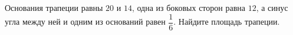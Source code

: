 \begin{ex}
	\begin{condition}
		Основания трапеции равны \( 20 \) и \( 14 \), одна из боковых сторон равна \( 12 \), а синус угла между ней и одним из оснований равен \( \dfrac{1}{6} \). Найдите площадь трапеции.
	\end{condition}
\end{ex}